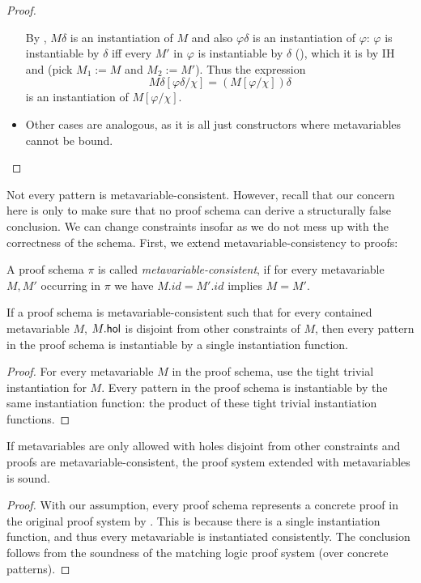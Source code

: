 \documentclass{mgr}
\begin{document}
\begin{theorem*}
\begin{proof}
\begin{itemize}
      By , $M\delta$ is an instantiation of $M$ and also $\varphi \delta$ is an instantiation of $\varphi$: $\varphi$ is instantiable by $\delta$ iff every $M'$ in $\varphi$ is instantiable by $\delta$ (), which it is by IH and  (pick $M_1 := M$ and $M_2 := M'$).
      Thus the expression \[M\delta[\varphi\delta/\chi] = (M[\varphi/\chi])\delta\] is an instantiation of $M[\varphi/\chi]$.
      \item Other cases are analogous, as it is all just constructors where metavariables cannot be bound.
    \end{itemize}
  \end{proof}
\end{theorem*}

Not every pattern is metavariable-consistent.
However, recall that our concern here is only to make sure that no proof schema can derive a structurally false conclusion.
We can change constraints insofar as we do not mess up with the correctness of the schema.
First, we extend metavariable-consistency to proofs:

\begin{definition}
  A proof schema $\pi$ is called \emph{metavariable-consistent}, if for every metavariable $M, M'$ occurring in $\pi$ we have $M.id = M'.id$ implies $M = M'$.
\end{definition}

\begin{theorem*}
  \label{theorem:main}
  If a proof schema is metavariable-consistent such that for every contained metavariable $M$, $M.\mathsf{hol}$ is disjoint from other constraints of $M$, then every pattern in the proof schema is instantiable by a single instantiation function.
  \begin{proof}
    For every metavariable $M$ in the proof schema, use the tight trivial instantiation for $M$.
    Every pattern in the proof schema is instantiable by the same instantiation function: the product of these tight trivial instantiation functions.
  \end{proof}
\end{theorem*}
\begin{corollary*}
  If metavariables are only allowed with holes disjoint from other constraints and proofs are metavariable-consistent, the proof system extended with metavariables is sound.
  \begin{proof}
  With our assumption, every proof schema represents a concrete proof in the original proof system by .
  This is because there is a single instantiation function, and thus every metavariable is instantiated consistently.
  The conclusion follows from the soundness of the matching logic proof system  (over concrete patterns).
  \end{proof}
\end{corollary*}
\end{document}
